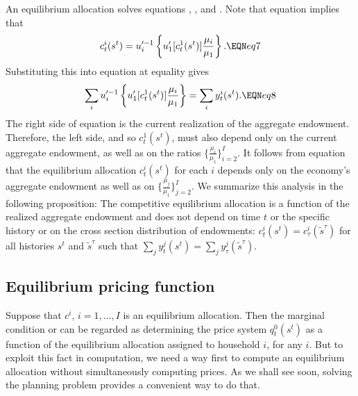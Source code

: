 An equilibrium allocation solves equations  ,  ,
and . Note that equation  implies that
$$ c_t^i(s^t) = u^{\prime -1}_i  \left\{u'_1[c_t^1(s^t)] {\mu_i \over \mu_1}
 \right\}. \EQN eq7 $$
Substituting this into equation  at equality gives
$$ \sum_i
u^{\prime -1}_i  \left\{u'_1[c_t^1(s^t)] {\mu_i \over \mu_1}\right\} =
       \sum_i y_t^i(s^t) .  \EQN eq8 $$
The right side of equation  is the current realization of
the aggregate endowment. %
Therefore, the left
side, and  so $c_t^1(s^t)$,  must also depend only on the current
aggregate endowment, as well as on the ratios
$\{ {\frac{\mu_i}{\mu_1}} \}_{i=2}^I$.  It follows from equation  that the
equilibrium allocation $c_t^i(s^t)$ for each $i$ depends only on
the economy's aggregate endowment as well as on
$\{ {\frac{\mu_j}{\mu_1}} \}_{j=2}^I$. We summarize this analysis  in
the following proposition:
\medskip
{}  The competitive equilibrium allocation
is a function of the realized aggregate endowment and does not depend
on time $t$ or the specific history or on
the cross section distribution of endowments:
$c_t^i(s^t)=c_\tau^i(\tilde s^{\tau})$ for all histories $s^t$ and $\tilde
s^{\tau}$ such that $\sum_j y_t^j(s^t) = \sum_j y_\tau^j(\tilde
s^{\tau})$.


\medskip








\subsection{Equilibrium pricing function}
  Suppose that $c^i$, $i=1, \ldots, I$  is an equilibrium allocation.
Then the   marginal condition  or  can be regarded as determining
the price system $q_t^0(s^t)$ as a function of the equilibrium allocation assigned
to household $i$, for any $i$. But to exploit this fact in computation, we need a way first to compute
an equilibrium allocation without simultaneously  computing prices.  As we shall see soon, solving the planning problem provides a convenient way
to do that.


